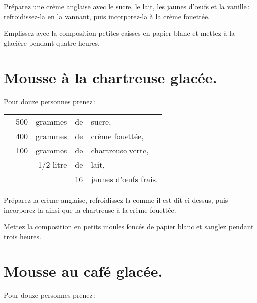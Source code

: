 Préparez une crème anglaise avec le sucre, le lait, les jaunes d'œufs et la
vanille : refroidissez-la en la vannant, puis incorporez-la à la crème
fouettée.

Emplissez avec la composition {\mmm} petites caisses en papier blanc et
mettez à la glacière pendant quatre heures.

\section*{\centering Mousse à la chartreuse glacée.}
{}

Pour douze personnes prenez :

\footnotesize
\begin{longtable}{rrrrp{16em}}
  & 500 & grammes & de & sucre,                                                                           \\
  & 400 & grammes & de & crème fouettée,                                                                  \\
  & 100 & grammes & de & chartreuse verte,                                                                \\
  & \multicolumn{2}{r}{1/2 litre} & de & lait,                                                            \\
  &     &         & 16 & jaunes d'œufs frais.                                                             \\
\end{longtable}
\normalsize

Préparez la crème anglaise, refroidissez-la comme il est dit ci-dessus, puis
incorporez-la ainsi que la chartreuse à la crème fouettée.

Mettez la composition en petits moules foncés de papier blanc et sanglez pendant
trois heures.

\section*{\centering Mousse au café glacée.}
{}

Pour douze personnes prenez :

